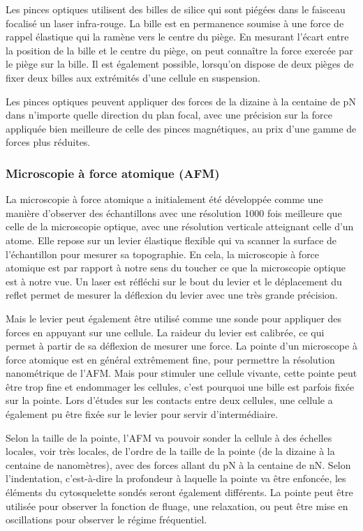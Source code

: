 \documentclass{report}
\begin{document}
Les pinces optiques utilisent des billes de silice qui sont piégées dans le faisceau focalisé un laser infra-rouge. 
La bille est en permanence soumise à une force de rappel élastique qui la ramène vers le centre du piège. 
En mesurant l'écart entre la position de la bille et le centre du piège, on peut connaître la force exercée par le piège sur la bille. 
Il est également possible, lorsqu'on dispose de deux pièges de fixer deux billes aux extrémités d'une cellule en suspension. 

Les pinces optiques peuvent appliquer des forces de la dizaine à la centaine de pN dans n'importe quelle direction du plan focal, avec une précision sur la force appliquée bien meilleure de celle des pinces magnétiques, au prix d'une gamme de forces plus réduites. 

\subsubsection{Microscopie à force atomique (AFM)}

La microscopie à force atomique a initialement été développée comme une manière d'observer des échantillons avec une résolution 1000 fois meilleure que celle de la microscopie optique, avec une résolution verticale atteignant celle d'un atome. 
Elle repose sur un levier élastique flexible qui va scanner la surface de l'échantillon pour mesurer sa topographie. En cela, la microscopie à force atomique est par rapport à notre sens du toucher ce que la microscopie optique est à notre vue. Un laser est réfléchi sur le bout du levier et le déplacement du reflet permet de mesurer la déflexion du levier avec une très grande précision. 

Mais le levier peut également être utilisé comme une sonde pour appliquer des forces en appuyant sur une cellule. La raideur du levier est calibrée, ce qui permet à partir de sa déflexion de mesurer une force. 
La pointe d'un microscope à force atomique est en général extrêmement fine, pour permettre la résolution nanométrique de l'AFM. Mais pour stimuler une cellule vivante, cette pointe peut être trop fine et endommager les cellules, c'est pourquoi une bille est parfois fixée sur la pointe. Lors d'études sur les contacts entre deux cellules, une cellule a également pu être fixée sur le levier pour servir d'intermédiaire. 

Selon la taille de la pointe, l'AFM va pouvoir sonder la cellule à des échelles locales, voir très locales, de l'ordre de la taille de la pointe (de la dizaine à la centaine de nanomètres), avec des forces allant du pN à la centaine de nN. Selon l'indentation, c'est-à-dire la profondeur à laquelle la pointe va être enfoncée, les éléments du cytosquelette sondés seront également différents. 
La pointe peut être utilisée pour observer la fonction de fluage, une relaxation, ou peut être mise en oscillations pour observer le régime fréquentiel. 
\end{document}
